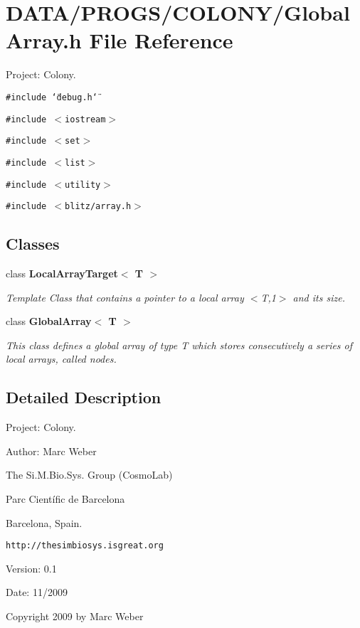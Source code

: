 \section{DATA/PROGS/COLONY/GlobalArray.h File Reference}
\label{GlobalArray_8h}
Project: Colony. 

{\tt \#include \char`\"{}debug.h\char`\"{}}\par
{\tt \#include $<$iostream$>$}\par
{\tt \#include $<$set$>$}\par
{\tt \#include $<$list$>$}\par
{\tt \#include $<$utility$>$}\par
{\tt \#include $<$blitz/array.h$>$}\par
\subsection*{Classes}
\begin{CompactItemize}
\item 
class {\bf LocalArrayTarget$<$ T $>$}
\begin{CompactList}\small\item\em Template Class that contains a pointer to a local array $<$T,1$>$ and its size. \item\end{CompactList}\item 
class {\bf GlobalArray$<$ T $>$}
\begin{CompactList}\small\item\em This class defines a global array of type T which stores consecutively a series of local arrays, called nodes. \item\end{CompactList}\end{CompactItemize}


\subsection{Detailed Description}
Project: Colony. 

\begin{Desc}
\item[Author:]Marc Weber\par
 The Si.M.Bio.Sys. Group (CosmoLab)\par
 Parc Científic de Barcelona\par
 Barcelona, Spain.\par
 {\tt http://thesimbiosys.isgreat.org} \end{Desc}
\begin{Desc}
\item[Version:]0.1 \end{Desc}
\begin{Desc}
\item[Date:]11/2009\end{Desc}
Copyright 2009 by Marc Weber 